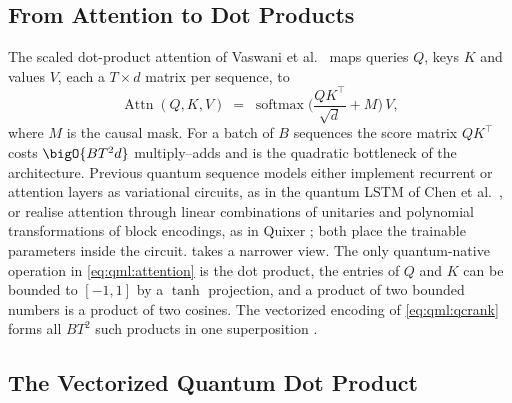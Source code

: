 \subsection{From Attention to Dot Products}\label{sec:qml:vqt:attention}

The scaled dot-product attention of Vaswani et al.~\cite{vaswani2017attention} maps queries $Q$, keys $K$ and values $V$, each a $T \times d$ matrix per sequence, to
\begin{equation}\label{eq:qml:attention}
\operatorname{Attn}(Q,K,V) \;=\; \operatorname{softmax}\!\Big(\frac{QK^{\top}}{\sqrt{d}} + M\Big)\,V,
\end{equation}
where $M$ is the causal mask. For a batch of $B$ sequences the score matrix $QK^\top$ costs $\bigO{BT^2 d}$ multiply--adds and is the quadratic bottleneck of the architecture. Previous quantum sequence models either implement recurrent or attention layers as variational circuits, as in the quantum LSTM of Chen et al.~\cite{chen2022qlstm}, or realise attention through linear combinations of unitaries and polynomial transformations of block encodings, as in Quixer \cite{khatri2024quixer}; both place the trainable parameters inside the circuit. \vqt{} takes a narrower view. The only quantum-native operation in \cref{eq:qml:attention} is the dot product, the entries of $Q$ and $K$ can be bounded to $[-1,1]$ by a $\tanh$ projection, and a product of two bounded numbers is a product of two cosines. The vectorized encoding of \cref{eq:qml:qcrank} forms all $BT^2$ such products in one superposition \cite{guo2025vqt}.

\subsection{The Vectorized Quantum Dot Product}\label{sec:qml:vqt:vqdp}

